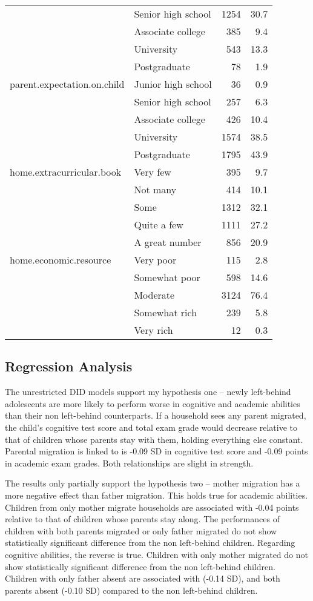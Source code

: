 \documentclass[
  man,floatsintext]{apa7}
\begin{document}
\begin{longtable}[]{@{}llrr@{}}
& Senior high school & 1254 & 30.7 \\
& Associate college & 385 & 9.4 \\
& University & 543 & 13.3 \\
& Postgraduate & 78 & 1.9 \\
parent.expectation.on.child & Junior high school & 36 & 0.9 \\
& Senior high school & 257 & 6.3 \\
& Associate college & 426 & 10.4 \\
& University & 1574 & 38.5 \\
& Postgraduate & 1795 & 43.9 \\
home.extracurricular.book & Very few & 395 & 9.7 \\
& Not many & 414 & 10.1 \\
& Some & 1312 & 32.1 \\
& Quite a few & 1111 & 27.2 \\
& A great number & 856 & 20.9 \\
home.economic.resource & Very poor & 115 & 2.8 \\
& Somewhat poor & 598 & 14.6 \\
& Moderate & 3124 & 76.4 \\
& Somewhat rich & 239 & 5.8 \\
& Very rich & 12 & 0.3 \\
\bottomrule
\end{longtable}

\hypertarget{regression-analysis}{%
\subsection{Regression Analysis}\label{regression-analysis}}

The unrestricted DID models support my hypothesis one -- newly left-behind adolescents are more likely to perform worse in cognitive and academic abilities than their non left-behind counterparts. If a household sees any parent migrated, the child's cognitive test score and total exam grade would decrease relative to that of children whose parents stay with them, holding everything else constant. Parental migration is linked to is -0.09 SD in cognitive test score and -0.09 points in academic exam grades. Both relationships are slight in strength.

The results only partially support the hypothesis two -- mother migration has a more negative effect than father migration. This holds true for academic abilities. Children from only mother migrate households are associated with -0.04 points relative to that of children whose parents stay along. The performances of children with both parents migrated or only father migrated do not show statistically significant difference from the non left-behind children. Regarding cognitive abilities, the reverse is true. Children with only mother migrated do not show statistically significant difference from the non left-behind children. Children with only father absent are associated with (-0.14 SD), and both parents absent (-0.10 SD) compared to the non left-behind children.
\end{document}
